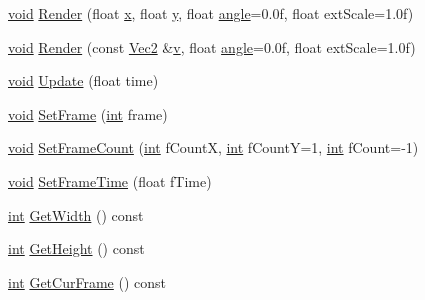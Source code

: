 \begin{DoxyCompactItemize}
\item 
\hyperlink{_s_d_l__opengles2__gl2ext_8h_ae5d8fa23ad07c48bb609509eae494c95}{void} \hyperlink{class_sprite_a01797197466499614f6d3662c9689bc9}{Render} (float \hyperlink{_s_d_l__opengl_8h_ad0e63d0edcdbd3d79554076bf309fd47}{x}, float \hyperlink{_s_d_l__opengl_8h_a1675d9d7bb68e1657ff028643b4037e3}{y}, float \hyperlink{_s_d_l__opengl__glext_8h_a9e06c1f76a20fed54ca742cd25cb02c4}{angle}=0.\-0f, float ext\-Scale=1.\-0f)
\item 
\hyperlink{_s_d_l__opengles2__gl2ext_8h_ae5d8fa23ad07c48bb609509eae494c95}{void} \hyperlink{class_sprite_a73fabb950e4027366ab85761bf00d684}{Render} (const \hyperlink{class_vec2}{Vec2} \&\hyperlink{_s_d_l__opengl_8h_a10a82eabcb59d2fcd74acee063775f90}{v}, float \hyperlink{_s_d_l__opengl__glext_8h_a9e06c1f76a20fed54ca742cd25cb02c4}{angle}=0.\-0f, float ext\-Scale=1.\-0f)
\item 
\hyperlink{_s_d_l__opengles2__gl2ext_8h_ae5d8fa23ad07c48bb609509eae494c95}{void} \hyperlink{class_sprite_a7234e69f8dacddac5652848606122eb1}{Update} (float time)
\item 
\hyperlink{_s_d_l__opengles2__gl2ext_8h_ae5d8fa23ad07c48bb609509eae494c95}{void} \hyperlink{class_sprite_a351dd54dac6cadbbdec48f9e1d8a36c0}{Set\-Frame} (\hyperlink{_s_d_l__thread_8h_a6a64f9be4433e4de6e2f2f548cf3c08e}{int} frame)
\item 
\hyperlink{_s_d_l__opengles2__gl2ext_8h_ae5d8fa23ad07c48bb609509eae494c95}{void} \hyperlink{class_sprite_ab801fc0fe155c4d7c61ca36d9e0c5532}{Set\-Frame\-Count} (\hyperlink{_s_d_l__thread_8h_a6a64f9be4433e4de6e2f2f548cf3c08e}{int} f\-Count\-X, \hyperlink{_s_d_l__thread_8h_a6a64f9be4433e4de6e2f2f548cf3c08e}{int} f\-Count\-Y=1, \hyperlink{_s_d_l__thread_8h_a6a64f9be4433e4de6e2f2f548cf3c08e}{int} f\-Count=-\/1)
\item 
\hyperlink{_s_d_l__opengles2__gl2ext_8h_ae5d8fa23ad07c48bb609509eae494c95}{void} \hyperlink{class_sprite_aafefc524417e38d2862ea1e937e450d8}{Set\-Frame\-Time} (float f\-Time)
\item 
\hyperlink{_s_d_l__thread_8h_a6a64f9be4433e4de6e2f2f548cf3c08e}{int} \hyperlink{class_sprite_a827cd586d97dfc614761a545d3384932}{Get\-Width} () const 
\item 
\hyperlink{_s_d_l__thread_8h_a6a64f9be4433e4de6e2f2f548cf3c08e}{int} \hyperlink{class_sprite_a623bec41db2bfd09a5dec27637017929}{Get\-Height} () const 
\item 
\hyperlink{_s_d_l__thread_8h_a6a64f9be4433e4de6e2f2f548cf3c08e}{int} \hyperlink{class_sprite_ace8829016a4bff0bf0234343a30cb59b}{Get\-Cur\-Frame} () const 

\end{DoxyCompactItemize}
